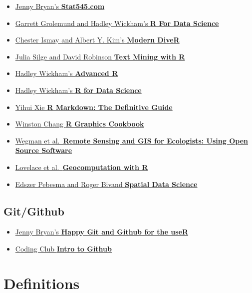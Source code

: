 \documentclass[
]{book}
\providecommand{\tightlist}{%
  \setlength{\itemsep}{0pt}\setlength{\parskip}{0pt}}
\begin{document}
\begin{itemize}
\tightlist
\item
  \href{http://stat545.com/}{Jenny Bryan's \textbf{Stat545.com}}
\item
  \href{http://r4ds.had.co.nz/}{Garrett Grolemund and Hadley Wickham's \textbf{R For Data Science}}
\item
  \href{https://ismayc.github.io/moderndiver-book/}{Chester Ismay and Albert Y. Kim's \textbf{Modern DiveR}}
\item
  \href{http://tidytextmining.com/}{Julia Silge and David Robinson \textbf{Text Mining with R}}
\item
  \href{http://adv-r.had.co.nz/}{Hadley Wickham's \textbf{Advanced R}}
\item
  \href{https://r4ds.had.co.nz}{Hadley Wickham's \textbf{R for Data Science}}
\item
  \href{https://bookdown.org/yihui/rmarkdown/}{Yihui Xie \textbf{R Markdown: The Definitive Guide}}
\item
  \href{http://www.cookbook-r.com/}{Winston Chang \textbf{R Graphics Cookbook}}
\item
  \href{http://book.ecosens.org/RSEbook/}{Wegman et al.~\textbf{Remote Sensing and GIS for Ecologists: Using Open Source Software}}
\item
  \href{https://geocompr.robinlovelace.net/}{Lovelace et al.~\textbf{Geocomputation with R}}
\item
  \href{https://keen-swartz-3146c4.netlify.app/index.html}{Edszer Pebesma and Roger Bivand \textbf{Spatial Data Science}}
\end{itemize}

\hypertarget{gitgithub}{%
\subsection{Git/Github}\label{gitgithub}}

\begin{itemize}
\tightlist
\item
  \href{http://happygitwithr.com/}{Jenny Bryan's \textbf{Happy Git and Github for the useR}}
\item
  \href{https://ourcodingclub.github.io/2017/02/27/git.html}{Coding Club \textbf{Intro to Github}}
\end{itemize}

\hypertarget{definitions}{%
\section{Definitions}\label{definitions}}
\end{document}
